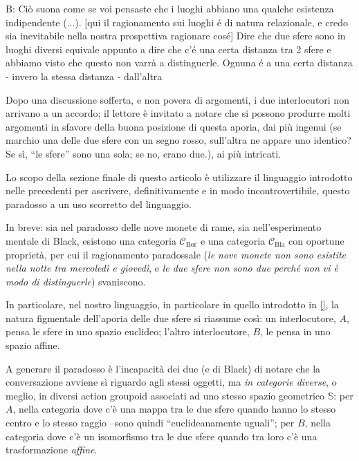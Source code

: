 \documentclass{amsart}
\begin{document}
B: Ciò suona come se voi pensaste che i luoghi abbiano una qualche esistenza indipendente (...). [qui il ragionamento sui luoghi é di natura relazionale, e credo sia inevitabile nella nostra prospettiva ragionare cos\'e] Dire che due sfere sono in luoghi diversi equivale appunto a dire che c'é una certa distanza tra 2 sfere e abbiamo visto che questo non varrà a distinguerle. Ognuna é a una certa distanza - invero la stessa distanza - dall'altra

Dopo una discussione sofferta, e non povera di argomenti, i due interlocutori non arrivano a un accordo; il lettore è invitato a notare che si possono produrre molti argomenti in sfavore della buona posizione di questa aporia, dai più ingenui (se marchio una delle due sfere con un segno rosso, sull'altra ne appare uno identico? Se sì, ``le sfere'' sono una sola; se no, erano due.), ai più intricati.

Lo scopo della sezione finale di questo articolo è utilizzare il linguaggio introdotto nelle precedenti per ascrivere, definitivamente e in modo incontrovertibile, questo paradosso a un uso scorretto del linguaggio.


In breve: sia nel paradosso delle nove monete di rame, sia nell'esperimento mentale di Black, esistono una categoria $\mathcal C_{\text{Bor}}$ e una categoria $\mathcal C_\text{Bla}$ con oportune proprietà, per cui il ragionamento paradossale (\emph{le nove monete non sono esistite nella notte tra mercoledì e giovedì}, e \emph{le due sfere non sono due perché non vi è modo di distinguerle}) svaniscono.

In particolare, nel nostro linguaggio, in particolare in quello introdotto in \ref{}, la natura figmentale dell'aporia delle due sfere si riassume così: un interlocutore, $A$, pensa le sfere in uno spazio euclideo; l'altro interlocutore, $B$, le pensa in uno spazio affine.

A generare il paradosso è l'incapacità dei due (e di Black) di notare che la conversazione avviene sì riguardo agli stessi oggetti, ma \emph{in categorie diverse}, o meglio, in diversi action groupoid associati ad uno stesso spazio geometrico $\mathbb S$: per $A$, nella categoria dove c'è una mappa tra le due sfere quando hanno lo stesso centro e lo stesso raggio --sono quindi ``euclideanamente uguali''; per $B$, nella categoria dove c'è un isomorfismo tra le due sfere quando tra loro c'è una trasformazione \emph{affine}.
\end{document}

